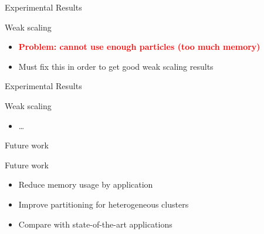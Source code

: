 \documentclass[aspectratio=43,t]{beamer}
\begin{document}
  \begin{frame}{Experimental Results}
    \begin{block}{Weak scaling}
      \begin{itemize}
        \item \textcolor{red}{\textbf{Problem: cannot use enough particles (too much memory)}}
        \item Must fix this in order to get good weak scaling results
      \end{itemize}
    \end{block}
  \end{frame}

  \begin{frame}{Experimental Results}
    \begin{block}{Weak scaling}
      \begin{itemize}
        \item \dots
      \end{itemize}
    \end{block}
  \end{frame}

  \begin{frame}{Future work}
    \begin{block}{Future work}
      \begin{itemize}
        \item Reduce memory usage by application
        \item Improve partitioning for heterogeneous clusters
        \item Compare with state-of-the-art applications
      \end{itemize}
    \end{block}
  \end{frame}

\end{document}
